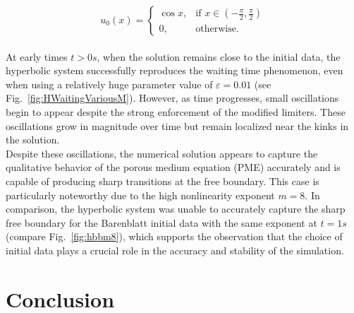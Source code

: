\documentclass[a4paper,12pt]{paper}
\begin{document}
\begin{equation*}
	u_0(x)= \begin{cases}
		\cos x, & \text{if } x \in\left(-\frac{\pi}{2}, \frac{\pi}{2}\right) \\
		0, & \text{otherwise}.
	\end{cases}
\end{equation*}\\
At early times \( t > 0s \), when the solution remains close to the initial data, the hyperbolic system successfully reproduces the waiting time phenomenon, even when using a relatively huge parameter value of \( \varepsilon = 0.01 \) (see Fig.~\ref{fig:HWaitingVariousM}). However, as time progresses, small oscillations begin to appear despite the strong enforcement of the modified limiters. These oscillations grow in magnitude over time but remain localized near the kinks in the solution.\\
Despite these oscillations, the numerical solution appears to capture the qualitative behavior of the porous medium equation (PME) accurately and is capable of producing sharp transitions at the free boundary. This case is particularly noteworthy due to the high nonlinearity exponent \( m = 8 \). In comparison, the hyperbolic system was unable to accurately capture the sharp free boundary for the Barenblatt initial data with the same exponent at \( t = 1s \) (compare Fig.~\ref{fig:hbbm8}), which supports the observation that the choice of initial data plays a crucial role in the accuracy and stability of the simulation.\\
\begin{table}
	\centering
	\caption{Compute times with the Barenblatt function as initial data at $t=1s$ with varying polynomial degree $l$, exponent $m=3$ and final simulation time of $t_{end} = 2s$}
	\label{table:Compute}
\end{table}
\clearpage
\section{Conclusion}
\end{document}
